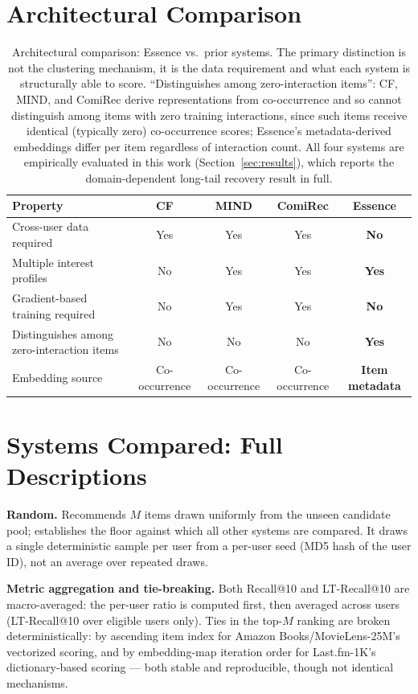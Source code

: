 \documentclass{article}
\begin{document}
\section{Architectural Comparison}
\label{app:comparison}

\begin{table}[H]
\centering
\caption{Architectural comparison: Essence vs.\ prior systems. The primary distinction is not the clustering mechanism, it is the data requirement and what each system is structurally able to score. ``Distinguishes among zero-interaction items'': CF, MIND, and ComiRec derive representations from co-occurrence and so cannot distinguish among items with zero training interactions, since such items receive identical (typically zero) co-occurrence scores; Essence's metadata-derived embeddings differ per item regardless of interaction count. All four systems are empirically evaluated in this work (Section~\ref{sec:results}), which reports the domain-dependent long-tail recovery result in full.}
\label{tab:comparison}
\small
\begin{tabular}{lcccc}
\toprule
\textbf{Property} & \textbf{CF} & \textbf{MIND} & \textbf{ComiRec} & \textbf{Essence} \\
\midrule
Cross-user data required & Yes & Yes & Yes & \textbf{No} \\
Multiple interest profiles & No & Yes & Yes & \textbf{Yes} \\
Gradient-based training required & No & Yes & Yes & \textbf{No} \\
Distinguishes among zero-interaction items & No & No & No & \textbf{Yes} \\
Embedding source & Co-occurrence & Co-occurrence & Co-occurrence & \textbf{Item metadata} \\
\bottomrule
\end{tabular}
\end{table}

\section{Systems Compared: Full Descriptions}
\label{app:systems}

\textbf{Random.} Recommends $M$ items drawn uniformly from the unseen candidate pool; establishes the floor against which all other systems are compared. It draws a single deterministic sample per user from a per-user seed (MD5 hash of the user ID), not an average over repeated draws.

\textbf{Metric aggregation and tie-breaking.} Both Recall@10 and LT-Recall@10 are macro-averaged: the per-user ratio is computed first, then averaged across users (LT-Recall@10 over eligible users only). Ties in the top-$M$ ranking are broken deterministically: by ascending item index for Amazon Books/MovieLens-25M's vectorized scoring, and by embedding-map iteration order for Last.fm-1K's dictionary-based scoring --- both stable and reproducible, though not identical mechanisms.
\end{document}

